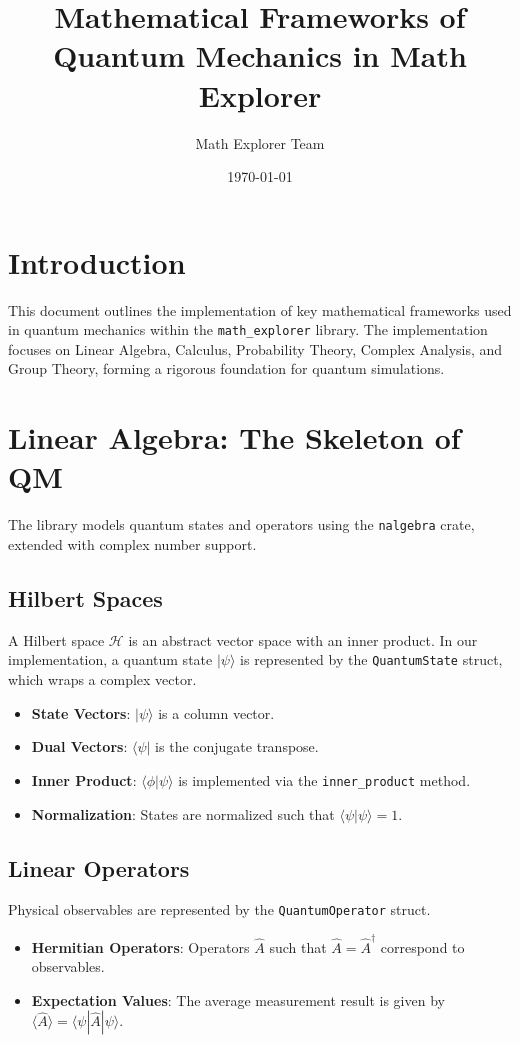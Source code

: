 \documentclass{article}
\title{Mathematical Frameworks of Quantum Mechanics in Math Explorer}
\author{Math Explorer Team}
\date{\today}
\begin{document}
\maketitle

\section{Introduction}
This document outlines the implementation of key mathematical frameworks used in quantum mechanics within the \texttt{math\_explorer} library. The implementation focuses on Linear Algebra, Calculus, Probability Theory, Complex Analysis, and Group Theory, forming a rigorous foundation for quantum simulations.

\section{Linear Algebra: The Skeleton of QM}
The library models quantum states and operators using the \texttt{nalgebra} crate, extended with complex number support.

\subsection{Hilbert Spaces}
A Hilbert space $\mathcal{H}$ is an abstract vector space with an inner product. In our implementation, a quantum state $|\psi\rangle$ is represented by the \texttt{QuantumState} struct, which wraps a complex vector.

\begin{itemize}
    \item \textbf{State Vectors}: $|\psi\rangle$ is a column vector.
    \item \textbf{Dual Vectors}: $\langle\psi|$ is the conjugate transpose.
    \item \textbf{Inner Product}: $\langle\phi|\psi\rangle$ is implemented via the \texttt{inner\_product} method.
    \item \textbf{Normalization}: States are normalized such that $\langle\psi|\psi\rangle = 1$.
\end{itemize}

\subsection{Linear Operators}
Physical observables are represented by the \texttt{QuantumOperator} struct.
\begin{itemize}
    \item \textbf{Hermitian Operators}: Operators $\hat{A}$ such that $\hat{A} = \hat{A}^\dagger$ correspond to observables.
    \item \textbf{Expectation Values}: The average measurement result is given by $\langle\hat{A}\rangle = \langle\psi|\hat{A}|\psi\rangle$.
\end{itemize}
\end{document}
